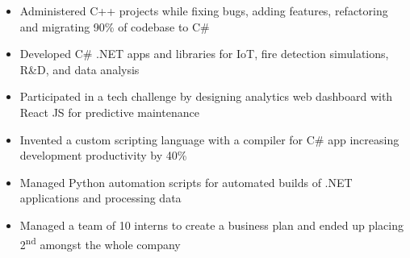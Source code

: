 \documentclass[11pt,a4paper,ragged2e]{altacv}
\begin{document}
\begin{paracol}{1}
\begin{itemize}
\item Administered C++ projects while fixing bugs, adding features, refactoring and migrating 90\% of codebase to C\#
\item Developed C\# .NET apps and libraries for IoT, fire detection simulations, R\&D, and data analysis
\item Participated in a tech challenge by designing analytics web dashboard with React JS for predictive maintenance 
\item Invented a custom scripting language with a compiler for C\# app increasing development productivity by 40\%
\item Managed Python automation scripts for automated builds of .NET applications and processing data  
\item Managed a team of 10 interns to create a business plan and ended up placing  2\textsuperscript{nd} amongst the whole company
\end{itemize}
\tightdivider


\end{paracol}
\end{document}
